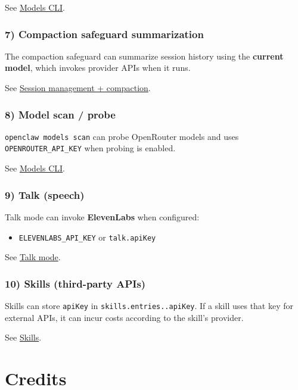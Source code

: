 See \href{/cli/models}{Models CLI}.

\subsubsection{7) Compaction safeguard summarization}


The compaction safeguard can summarize session history using the \textbf{current model}, which
invokes provider APIs when it runs.

See \href{/reference/session-management-compaction}{Session management + compaction}.

\subsubsection{8) Model scan / probe}


\texttt{openclaw models scan} can probe OpenRouter models and uses \texttt{OPENROUTER\_API\_KEY} when
probing is enabled.

See \href{/cli/models}{Models CLI}.

\subsubsection{9) Talk (speech)}


Talk mode can invoke \textbf{ElevenLabs} when configured:

\begin{itemize}
  \item \texttt{ELEVENLABS\_API\_KEY} or \texttt{talk.apiKey}
\end{itemize}


See \href{/nodes/talk}{Talk mode}.

\subsubsection{10) Skills (third-party APIs)}


Skills can store \texttt{apiKey} in \texttt{skills.entries..apiKey}. If a skill uses that key for external
APIs, it can incur costs according to the skill’s provider.

See \href{/tools/skills}{Skills}.


\clearpage

\section{Credits}

